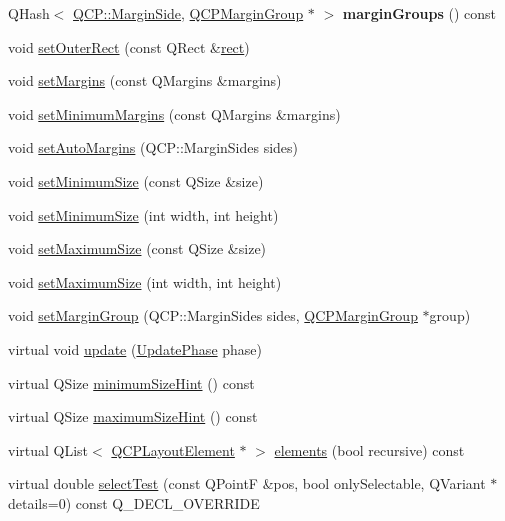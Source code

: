 \begin{DoxyCompactItemize}
\item 
\mbox{\label{class_q_c_p_layout_element_ac8d1139a81a1625860647e307ae2b733}} 
Q\+Hash$<$ \hyperlink{namespace_q_c_p_a7e487e3e2ccb62ab7771065bab7cae54}{Q\+C\+P\+::\+Margin\+Side}, \hyperlink{class_q_c_p_margin_group}{Q\+C\+P\+Margin\+Group} $\ast$ $>$ {\bfseries margin\+Groups} () const
\item 
void \hyperlink{class_q_c_p_layout_element_a38975ea13e36de8e53391ce41d94bc0f}{set\+Outer\+Rect} (const Q\+Rect \&\hyperlink{class_q_c_p_layout_element_a208effccfe2cca4a0eaf9393e60f2dd4}{rect})
\item 
void \hyperlink{class_q_c_p_layout_element_a8f450b1f3f992ad576fce2c63d8b79cf}{set\+Margins} (const Q\+Margins \&margins)
\item 
void \hyperlink{class_q_c_p_layout_element_a0a8a17abc16b7923159fcc7608f94673}{set\+Minimum\+Margins} (const Q\+Margins \&margins)
\item 
void \hyperlink{class_q_c_p_layout_element_accfda49994e3e6d51ed14504abf9d27d}{set\+Auto\+Margins} (Q\+C\+P\+::\+Margin\+Sides sides)
\item 
void \hyperlink{class_q_c_p_layout_element_a5dd29a3c8bc88440c97c06b67be7886b}{set\+Minimum\+Size} (const Q\+Size \&size)
\item 
void \hyperlink{class_q_c_p_layout_element_a8e0447614a0bf92de9a7304588c6b96e}{set\+Minimum\+Size} (int width, int height)
\item 
void \hyperlink{class_q_c_p_layout_element_a74eb5280a737ab44833d506db65efd95}{set\+Maximum\+Size} (const Q\+Size \&size)
\item 
void \hyperlink{class_q_c_p_layout_element_a03e0e9c48f230217c529b0819f832d84}{set\+Maximum\+Size} (int width, int height)
\item 
void \hyperlink{class_q_c_p_layout_element_a516e56f76b6bc100e8e71d329866847d}{set\+Margin\+Group} (Q\+C\+P\+::\+Margin\+Sides sides, \hyperlink{class_q_c_p_margin_group}{Q\+C\+P\+Margin\+Group} $\ast$group)
\item 
virtual void \hyperlink{class_q_c_p_layout_element_a929c2ec62e0e0e1d8418eaa802e2af9b}{update} (\hyperlink{class_q_c_p_layout_element_a0d83360e05735735aaf6d7983c56374d}{Update\+Phase} phase)
\item 
virtual Q\+Size \hyperlink{class_q_c_p_layout_element_ab3fdb5c9a5189bb2dac10d4d25329cd8}{minimum\+Size\+Hint} () const
\item 
virtual Q\+Size \hyperlink{class_q_c_p_layout_element_ab5ce2ba22b36d9a3b70a1be562c326e5}{maximum\+Size\+Hint} () const
\item 
virtual Q\+List$<$ \hyperlink{class_q_c_p_layout_element}{Q\+C\+P\+Layout\+Element} $\ast$ $>$ \hyperlink{class_q_c_p_layout_element_a76dec8cb31e498994a944d7647a43309}{elements} (bool recursive) const
\item 
virtual double \hyperlink{class_q_c_p_layout_element_ae97f483cccedadbf18ea4525ef240ee4}{select\+Test} (const Q\+PointF \&pos, bool only\+Selectable, Q\+Variant $\ast$details=0) const Q\+\_\+\+D\+E\+C\+L\+\_\+\+O\+V\+E\+R\+R\+I\+DE
\end{DoxyCompactItemize}

